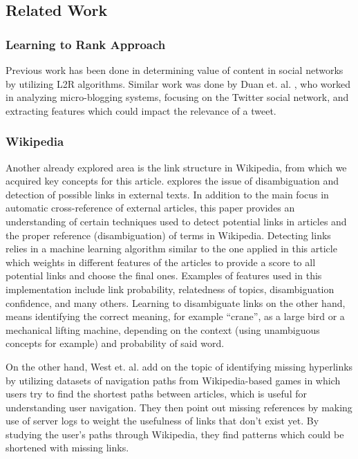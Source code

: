 \subsection{Related Work}
\subsubsection*{Learning to Rank Approach}
Previous work has been done in determining value of content in social networks by utilizing L2R algorithms. Similar work was done by Duan et. al. \cite{l2rtwitter}, who worked in analyzing micro-blogging systems, focusing on the Twitter social network, and extracting features which could impact the relevance of a tweet. 

\subsubsection*{Wikipedia}
Another already explored area is the link structure in Wikipedia, from which we acquired key concepts for this article. \cite{learning_link} explores the issue of disambiguation and detection of possible links in external texts. In addition to the main focus in automatic cross-reference of external articles, this paper provides an understanding of certain techniques used to detect potential links in articles and the proper reference (disambiguation) of terms in Wikipedia. Detecting links relies in a machine learning algorithm similar to the one applied in this article which weights in different features of the articles to provide a score to all potential links and choose the final ones. Examples of features used in this implementation include link probability, relatedness of topics, disambiguation confidence, and many others.  Learning to disambiguate links on the other hand, means identifying the correct meaning, for example ``crane'', as a large bird or a mechanical lifting machine, depending on the context (using unambiguous concepts for example) and probability of said word.

On the other hand, West et. al. \cite{west} add on the topic of identifying missing hyperlinks by utilizing datasets of navigation paths from Wikipedia-based games in which users try to find the shortest paths between articles, which is useful for understanding user navigation. They then\cite{paranjape}  point out missing references by making use of server logs to weight the usefulness of links that don't exist yet. By studying the user's paths through Wikipedia, they find patterns which could be shortened with missing links.